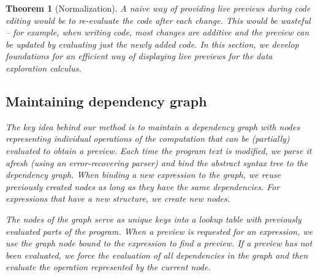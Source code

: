 \documentclass[acmsmall,anonymous,fleqn]{acmart}\settopmatter{printfolios=false,printccs=false,printacmref=false}
\newcounter{thc}
\theoremstyle{plain}
\newtheorem{theorem}[thc]{Theorem}
\theoremstyle{definition}
\begin{document}
\begin{theorem}[Normalization]
A naive way of providing live previews during code editing would be to re-evaluate the code
after each change. This would be wasteful -- for example, when writing
code, most changes are additive and the preview can be updated by evaluating just the newly added
code. In this section, we develop foundations for an efficient way of displaying live previews
for the data exploration calculus.


\subsection{Maintaining dependency graph}
\label{sec:formal-deps}

The key idea behind our method is to maintain a dependency graph \cite{dependencies} with
nodes representing individual operations of the computation that can be (partially) evaluated
to obtain a preview. Each time the program text is modified, we parse it afresh (using an
error-recovering parser) and bind the abstract syntax tree to the dependency graph.
When binding a new expression to the graph, we reuse previously created nodes as long as
they have the same dependencies. For expressions that have a new structure, we create new nodes.

The nodes of the graph serve as unique keys into a lookup table with previously
evaluated parts of the program. When a preview is requested for an expression, we use the graph
node bound to the expression to find a preview. If a preview has not been evaluated, we force
the evaluation of all dependencies in the graph and then evaluate the operation represented by
the current node.



\end{theorem}
\end{document}
